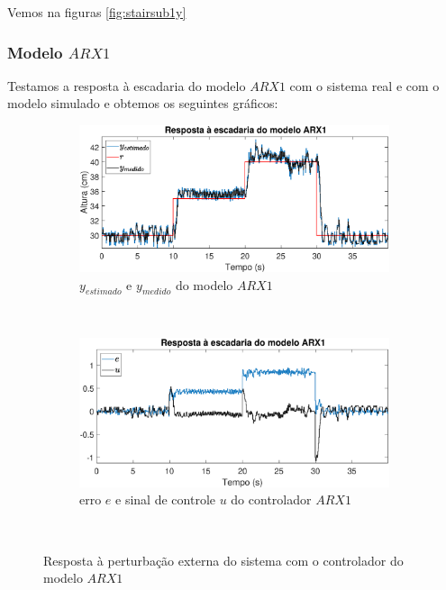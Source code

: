 Vemos na figuras \ref{fig:stairsub1y}

\subsubsection{Modelo $ARX1$}
Testamos a resposta à escadaria do modelo $ARX1$ com o sistema real e com o modelo simulado e obtemos os seguintes gráficos:

\begin{figure}[htb]
	\centering
	\begin{subfigure}[t]{0.48\textwidth}
		\includegraphics[width=1\linewidth]{stairrarx1y}
		\caption[$y_{estimado}$ e $y_{medido}$ do modelo $ARX1$]{$y_{estimado}$ e $y_{medido}$ do modelo $ARX1$}
		\label{fig:stairrarx1y}
	\end{subfigure}
	~ %
	\begin{subfigure}[t]{0.48\textwidth}
		\includegraphics[width=1\linewidth]{stairrarx1e}
		\caption[erro $e$ e sinal de controle $u$ do controlador $ARX1$]{erro $e$ e sinal de controle $u$ do controlador $ARX1$}
		\label{fig:stairrarx1e}
	\end{subfigure}
	~ %
	
	\caption{Resposta à perturbação externa do sistema com o controlador do modelo $ARX1$}\label{fig:stairrarx1}
\end{figure}

